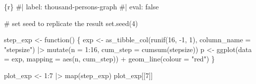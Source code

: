 \documentclass[
  letterpaper,
  DIV=11,
  numbers=noendperiod]{scrreprt}
\newenvironment{Shaded}{\begin{snugshade}}{\end{snugshade}}
\newcommand{\AttributeTok}[1]{\textcolor[rgb]{0.40,0.45,0.13}{#1}}
\newcommand{\CommentTok}[1]{\textcolor[rgb]{0.37,0.37,0.37}{#1}}
\newcommand{\ControlFlowTok}[1]{\textcolor[rgb]{0.00,0.23,0.31}{#1}}
\newcommand{\DecValTok}[1]{\textcolor[rgb]{0.68,0.00,0.00}{#1}}
\newcommand{\FunctionTok}[1]{\textcolor[rgb]{0.28,0.35,0.67}{#1}}
\newcommand{\InformationTok}[1]{\textcolor[rgb]{0.37,0.37,0.37}{#1}}
\newcommand{\NormalTok}[1]{\textcolor[rgb]{0.00,0.23,0.31}{#1}}
\newcommand{\OtherTok}[1]{\textcolor[rgb]{0.00,0.23,0.31}{#1}}
\newcommand{\SpecialCharTok}[1]{\textcolor[rgb]{0.37,0.37,0.37}{#1}}
\newcommand{\StringTok}[1]{\textcolor[rgb]{0.13,0.47,0.30}{#1}}
\begin{document}
\begin{Shaded}
\begin{Highlighting}[]
\InformationTok{\textasciigrave{}\textasciigrave{}\textasciigrave{}\{r\}}
\CommentTok{\#| label: thousand{-}persons{-}graph}
\CommentTok{\#| eval: false}

\CommentTok{\# set seed to replicate the result}
\FunctionTok{set.seed}\NormalTok{(}\DecValTok{4}\NormalTok{)}

\NormalTok{step\_exp }\OtherTok{\textless{}{-}} \ControlFlowTok{function}\NormalTok{() \{}
\NormalTok{    exp }\OtherTok{\textless{}{-}} \FunctionTok{as\_tibble\_col}\NormalTok{(}\FunctionTok{runif}\NormalTok{(}\DecValTok{16}\NormalTok{, }\SpecialCharTok{{-}}\DecValTok{1}\NormalTok{, }\DecValTok{1}\NormalTok{), }
                         \AttributeTok{column\_name =} \StringTok{"stepsize"}\NormalTok{) }\SpecialCharTok{|\textgreater{}} 
        \FunctionTok{mutate}\NormalTok{(}\AttributeTok{n =} \DecValTok{1}\SpecialCharTok{:}\DecValTok{16}\NormalTok{, }\AttributeTok{cum\_step =} \FunctionTok{cumsum}\NormalTok{(stepsize))}
\NormalTok{    p }\OtherTok{\textless{}{-}} \FunctionTok{ggplot}\NormalTok{(}\AttributeTok{data =}\NormalTok{ exp, }\AttributeTok{mapping =} \FunctionTok{aes}\NormalTok{(n, cum\_step)) }\SpecialCharTok{+}
        \FunctionTok{geom\_line}\NormalTok{(}\AttributeTok{colour =} \StringTok{"red"}\NormalTok{)}
\NormalTok{\}}

\NormalTok{plot\_exp }\OtherTok{\textless{}{-}} \DecValTok{1}\SpecialCharTok{:}\DecValTok{7} \SpecialCharTok{|\textgreater{}} 
    \FunctionTok{map}\NormalTok{(step\_exp)}
\NormalTok{plot\_exp[[}\DecValTok{7}\NormalTok{]]}

\InformationTok{\textasciigrave{}\textasciigrave{}\textasciigrave{}}
\end{Highlighting}
\end{Shaded}
\end{document}
